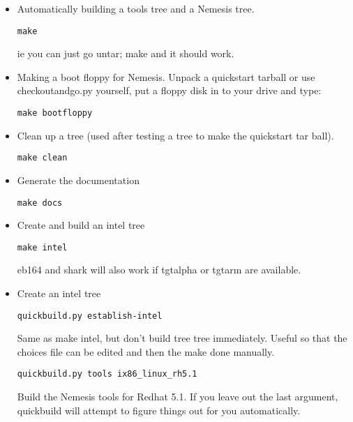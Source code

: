 \documentclass[a4paper]{article}
\begin{document}
\begin{itemize}

\item Automatically building a tools tree and a Nemesis tree.

\begin{verbatim}
make
\end{verbatim}

ie you can just go untar; make and it should work.

\item Making a boot floppy for Nemesis. Unpack a quickstart tarball or
use checkoutandgo.py yourself, put a floppy disk in to your drive and
type:

\begin{verbatim}
make bootfloppy
\end{verbatim}

\item Clean up a tree (used after testing a tree to make the
quickstart tar ball).

\begin{verbatim}
make clean
\end{verbatim}

\item Generate the documentation

\begin{verbatim}
make docs
\end{verbatim}

\item Create and build an intel tree

\begin{verbatim}
make intel
\end{verbatim}

eb164 and shark will also work if tgtalpha or tgtarm are available.

\item Create an intel tree

\begin{verbatim}
quickbuild.py establish-intel
\end{verbatim}

Same as make intel, but don't build tree tree immediately. Useful so
that the choices file can be edited and then the make done manually.

\begin{verbatim}
quickbuild.py tools ix86_linux_rh5.1
\end{verbatim}

Build the Nemesis tools for Redhat 5.1. If you leave out the last
argument, quickbuild will attempt to figure things out for you
automatically.

\end{itemize}
\end{document}
